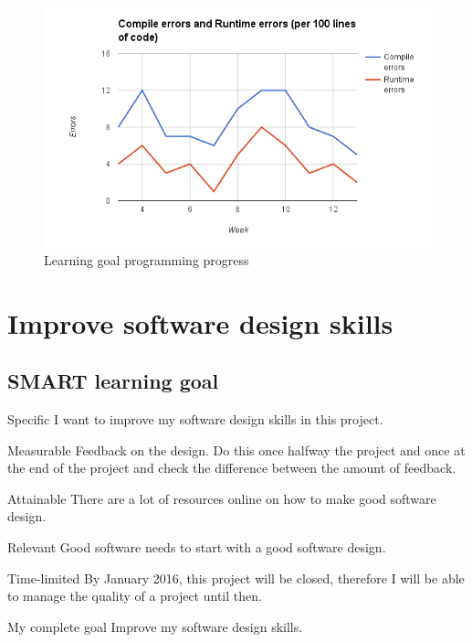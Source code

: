 \documentclass[12pt]{article}
\begin{document}
	\begin{figure}[ht]
		
		\centering
		\includegraphics[width=\textwidth, keepaspectratio=true]{personaldossiers/LearningGoalProgrammingMartijn.png}
		\caption{Learning goal programming progress}\label{lgprogramming}
	\end{figure}
	
	\clearpage
	\section{Improve software design skills}
	\subsection{SMART learning goal}
	\begin{SMART}
	    \item[Specific] I want to improve my software design skills in this project.
	    \item[Measurable] Feedback on the design. Do this once halfway the project and once at the end of the project and check the difference between the amount of feedback.
	    \item[Attainable] There are a lot of resources online on how to make good software design.
	    \item[Relevant] Good software needs to start with a good software design.
	    \item[Time-limited] By January 2016, this project will be closed, therefore I will be able to manage the quality of a project until then.
	    \item[My complete goal] Improve my software design skills.
	\end{SMART}
	
\end{document}
